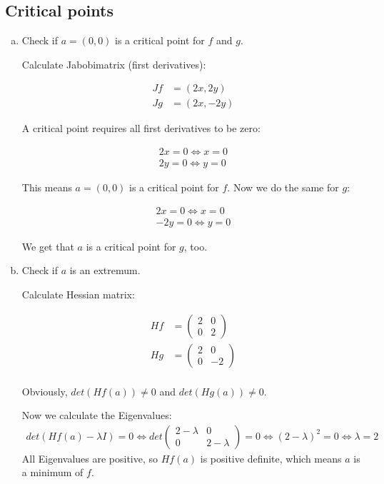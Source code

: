 \documentclass[11pt,a4paper]{article}
\begin{document}
\subsection{Critical points}

\begin{enumerate}[a)]

\item Check if $a=(0,0)$ is a critical point for $f$ and $g$.

Calculate Jabobimatrix (first derivatives):

\begin{align*}
	Jf &= (2x, 2y) \\
	Jg &= (2x, -2y)
\end{align*}

A critical point requires all first derivatives to be zero:

\begin{align*}
	2x = 0 \Leftrightarrow x = 0 \\
	2y = 0 \Leftrightarrow y = 0
\end{align*}

This means $a = (0,0)$ is a critical point for $f$. Now we do the same for $g$:

\begin{align*}
	2x = 0 \Leftrightarrow x = 0 \\
	-2y = 0 \Leftrightarrow y = 0
\end{align*}

We get that $a$ is a critical point for $g$, too.

\item Check if $a$ is an extremum.

Calculate Hessian matrix:

\begin{align*}
	Hf &= \left(\begin{array}{ccc}
		2 & 0 \\
		0 & 2
		\end{array} \right) \\
	Hg &= \left(\begin{array}{ccc}
		2 & 0 \\
		0 & -2
		\end{array} \right) \\
\end{align*}

Obviously, $det(Hf(a)) \neq 0$ and $det(Hg(a)) \neq 0$.

Now we calculate the Eigenvalues:
\begin{align*}
	det(Hf(a) - \lambda I) = 0
	\Leftrightarrow det \left(\begin{array}{ccc} 2-\lambda & 0 \\ 0 & 2-\lambda \end{array} \right) = 0
	\Leftrightarrow (2-\lambda)^2 = 0
	\Leftrightarrow \lambda = 2
\end{align*}
All Eigenvalues are positive, so $Hf(a)$ is positive definite, which means $a$ is a minimum of $f$.


\end{enumerate}
\end{document}
